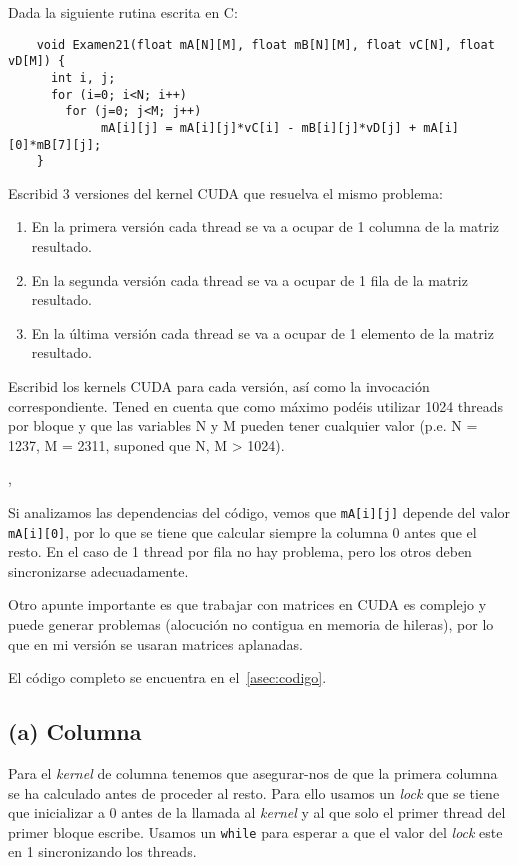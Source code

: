 \begin{pregunta}{Dada la siguiente rutina escrita en C:}
    \begin{verbatim}
    void Examen21(float mA[N][M], float mB[N][M], float vC[N], float vD[M]) {
      int i, j;
      for (i=0; i<N; i++)
        for (j=0; j<M; j++)
             mA[i][j] = mA[i][j]*vC[i] - mB[i][j]*vD[j] + mA[i][0]*mB[7][j];
    }
    \end{verbatim}

    Escribid 3 versiones del kernel CUDA que resuelva el mismo problema:

\begin{enumerate}[label=(\alph*)]
    \item En la primera versión cada thread se va a ocupar de 1 columna de la matriz resultado.
    \item En la segunda versión cada thread se va a ocupar de 1 fila de la matriz resultado.
    \item En la última versión cada thread se va a ocupar de 1 elemento de la matriz resultado.
\end{enumerate}

Escribid los kernels CUDA para cada versión, así como la invocación
correspondiente. Tened en cuenta que como máximo podéis utilizar 1024 threads
por bloque y que las variables N y M pueden tener cualquier valor (p.e. N =
1237, M = 2311, suponed que N, M > 1024).

\vspace{1em} \sep{}

Si analizamos las dependencias del código, vemos que \texttt{mA[i][j]} depende
del valor \texttt{mA[i][0]}, por lo que se tiene que calcular siempre la columna
0 antes que el resto. En el caso de 1 thread por fila no hay problema, pero los
otros deben sincronizarse adecuadamente.

Otro apunte importante es que trabajar con matrices en CUDA es complejo y puede
generar problemas (alocución no contigua en memoria de hileras), por lo que en
mi versión se usaran matrices aplanadas.

El código completo se encuentra en el~\cref{asec:codigo}.

\pagebreak
\subsection*{(a) Columna}

Para el \emph{kernel} de columna tenemos que asegurar-nos de que la primera columna
se ha calculado antes de proceder al resto. Para ello usamos un \emph{lock} que
se tiene que inicializar a 0 antes de la llamada al \emph{kernel} y al que solo el
primer thread del primer bloque escribe. Usamos un \texttt{while} para esperar a que
el valor del \emph{lock} este en 1 sincronizando los threads.


\end{pregunta}
